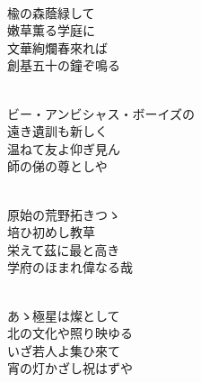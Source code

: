 \documentclass[10pt,b5j]{tarticle} %
\begin{document}
\vspace{1.5em} %
\newcommand{\linespace}{0.5em} %
\newcommand{\blocksize}{0.5\hsize} %
\newcommand{\itemmargin}{3em} %
\begin{enumerate} %
    \setlength{\itemindent}{\itemmargin} %
    \begin{minipage}[c]{\blocksize}
    
        \vspace{\linespace}
        \item~\\
        楡の森蔭緑して\\
        嫩草薫る学庭に\\
        文華絢爛春來れば\\
        創基五十の鐘ぞ鳴る
        
    \end{minipage}
    \begin{minipage}[c]{\blocksize}
        
        \vspace{\linespace}
        \item~\\
        ビー・アンビシャス・ボーイズの\\
        遠き遺訓も新しく\\
        温ねて友よ仰ぎ見ん\\
        師の俤の尊としや
        
    \end{minipage}
    \begin{minipage}[c]{\blocksize}
        
        \vspace{\linespace}
        \item~\\
        原始の荒野拓きつゝ\\
        培ひ初めし教草\\
        栄えて茲に最と高き\\
        学府のほまれ偉なる哉
        
    \end{minipage}
    \begin{minipage}[c]{\blocksize}
        
        \vspace{\linespace}
        \item~\\
        あゝ極星は燦として\\
        北の文化や照り映ゆる\\
        いざ若人よ集ひ來て\\
        宵の灯かざし祝はずや
        

\end{minipage}
\end{enumerate}
\end{document}
